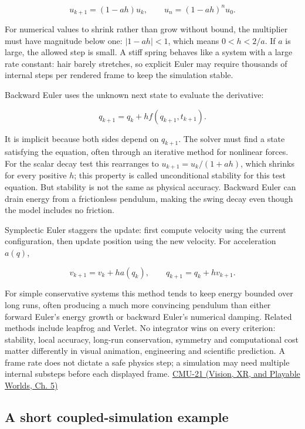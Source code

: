 \[
u_{k+1}=(1-ah)u_k,
\qquad
u_n=(1-ah)^n u_0.
\]

For numerical values to shrink rather than grow without bound, the multiplier must have magnitude below one: \(|1-ah|<1\), which means \(0<h<2/a\). If \(a\) is large, the allowed step is small. A stiff spring behaves like a system with a large rate constant: hair barely stretches, so explicit Euler may require thousands of internal steps per rendered frame to keep the simulation stable.

Backward Euler uses the unknown next state to evaluate the derivative:

\[
q_{k+1}=q_k+h f(q_{k+1},t_{k+1}).
\]

It is implicit because both sides depend on \(q_{k+1}\). The solver must find a state satisfying the equation, often through an iterative method for nonlinear forces. For the scalar decay test this rearranges to \(u_{k+1}=u_k/(1+ah)\), which shrinks for every positive \(h\); this property is called unconditional stability for this test equation. But stability is not the same as physical accuracy. Backward Euler can drain energy from a frictionless pendulum, making the swing decay even though the model includes no friction.

Symplectic Euler staggers the update: first compute velocity using the current configuration, then update position using the new velocity. For acceleration \(a(q)\),

\[
v_{k+1}=v_k+h a(q_k),\qquad q_{k+1}=q_k+h v_{k+1}.
\]

For simple conservative systems this method tends to keep energy bounded over long runs, often producing a much more convincing pendulum than either forward Euler's energy growth or backward Euler's numerical damping. Related methods include leapfrog and Verlet. No integrator wins on every criterion: stability, local accuracy, long-run conservation, symmetry and computational cost matter differently in visual animation, engineering and scientific prediction. A frame rate does not dictate a safe physics step; a simulation may need multiple internal substeps before each displayed frame. \href{../07-Vision-XR-and-Playable-Worlds/main.pdf\#nameddest=04-visual-computing-ii-ch036-cmu-21---dynamics-and-time-integration}{CMU-21 (Vision, XR, and Playable Worlds, Ch. 5)}

\subsection{A short coupled-simulation example}\label{04-visual-computing-ii-ch029-a-short-coupled-simulation-example}

